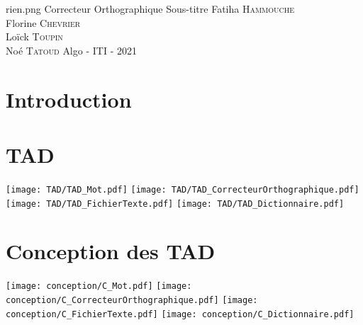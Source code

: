 \documentclass[11pt,a4paper]{article}
\begin{document}
\PageDeGarde	
{rien.png} %
{Correcteur Orthographique} %
{Sous-titre} %
{Fatiha \textsc{Hammouche} \\
Florine \textsc{Chevrier} \\
Loïck \textsc{Toupin} \\
Noé \textsc{Tatoud}}
{Algo - ITI - 2021} %



\tableofcontents

\clearpage
\section{Introduction}

\clearpage
\section{TAD}
	\texttt{[image: TAD/TAD\_Mot.pdf]}
	\texttt{[image: TAD/TAD\_CorrecteurOrthographique.pdf]}
	\texttt{[image: TAD/TAD\_FichierTexte.pdf]}
	\texttt{[image: TAD/TAD\_Dictionnaire.pdf]}

\clearpage
\section{Conception des TAD}
	\texttt{[image: conception/C\_Mot.pdf]}
	\texttt{[image: conception/C\_CorrecteurOrthographique.pdf]}
	\texttt{[image: conception/C\_FichierTexte.pdf]}
	\texttt{[image: conception/C\_Dictionnaire.pdf]}
\end{document}

